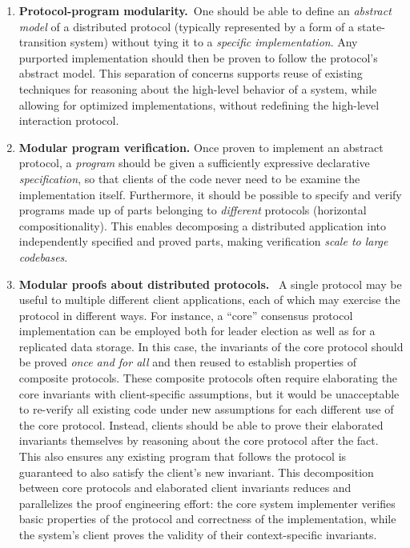 \begin{enumerate}
\item \textbf{Protocol-program modularity.}~One should be
able to define an \emph{abstract model} of a distributed protocol
(typically represented by a form of a state-transition system) without
tying it to a \emph{specific implementation}.
Any purported implementation should then be
proven to follow the protocol's abstract model.
This separation of concerns supports reuse of existing techniques for
reasoning about the high-level behavior of a system, while allowing
for optimized implementations, without redefining the high-level
interaction protocol.

\item \textbf{Modular program verification.} Once proven to implement
  an abstract protocol, a \emph{program} should be given a
  sufficiently expressive declarative \emph{specification}, so that
  clients of the code never need to be examine the implementation itself.
%
  Furthermore, it should be possible to specify and verify programs
  made up of parts belonging to \emph{different} protocols (horizontal
  compositionality).
%
  This enables decomposing a distributed application into
  independently specified and proved parts, making verification
  \emph{scale to large codebases}.

\item \textbf{Modular proofs about distributed protocols.}~
  A single protocol may be useful to multiple different client
  applications, each of which may exercise the protocol in
  different ways.
%
  For instance, a ``core'' consensus protocol implementation can be
  employed both for leader election as well as for a replicated data
  storage.
  In this case, the invariants of the core protocol should be proved
  \emph{once and for all} and then reused to establish
  properties of composite protocols.
  These composite protocols often require elaborating the core
  invariants with client-specific assumptions, but it would be
  unacceptable to re-verify all existing code under new
  assumptions for each different use of the core protocol.
  Instead, clients should be able to prove their elaborated invariants
  themselves by reasoning about the core protocol after the fact.
  This also ensures any existing program that follows the protocol is
  guaranteed to also satisfy the client's new invariant.
  This decomposition between core protocols and elaborated client
  invariants reduces and parallelizes the proof engineering effort:
  the core system implementer verifies basic properties of the
  protocol and correctness of the implementation, while the system's
  client proves the validity of their context-specific invariants.

\end{enumerate}

